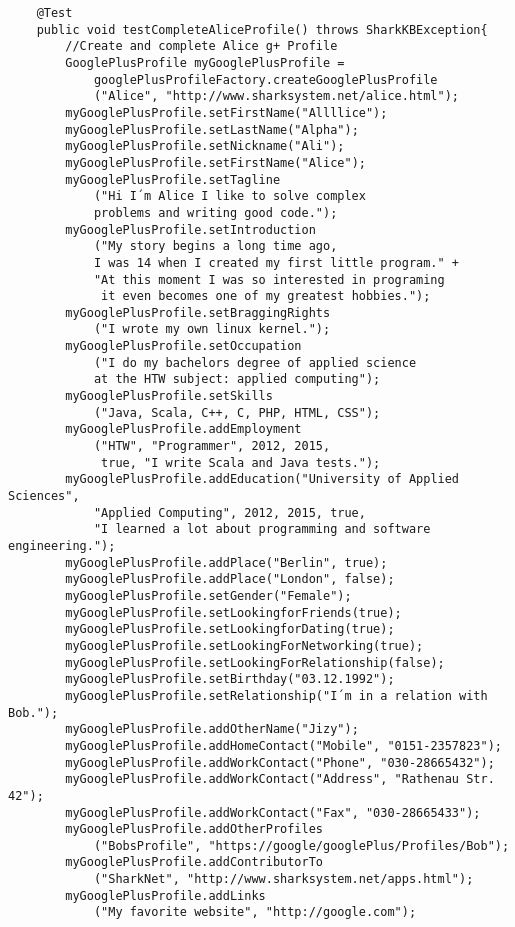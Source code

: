 \documentclass[12pt]{article}
\begin{document}
\begin{verbatim}
    @Test
    public void testCompleteAliceProfile() throws SharkKBException{
        //Create and complete Alice g+ Profile
        GooglePlusProfile myGooglePlusProfile =
            googlePlusProfileFactory.createGooglePlusProfile
            ("Alice", "http://www.sharksystem.net/alice.html");
        myGooglePlusProfile.setFirstName("Allllice");
        myGooglePlusProfile.setLastName("Alpha");
        myGooglePlusProfile.setNickname("Ali");
        myGooglePlusProfile.setFirstName("Alice");
        myGooglePlusProfile.setTagline
            ("Hi I´m Alice I like to solve complex
            problems and writing good code.");
        myGooglePlusProfile.setIntroduction
            ("My story begins a long time ago,
            I was 14 when I created my first little program." +
            "At this moment I was so interested in programing
             it even becomes one of my greatest hobbies.");
        myGooglePlusProfile.setBraggingRights
            ("I wrote my own linux kernel.");
        myGooglePlusProfile.setOccupation
            ("I do my bachelors degree of applied science
            at the HTW subject: applied computing");
        myGooglePlusProfile.setSkills
            ("Java, Scala, C++, C, PHP, HTML, CSS");
        myGooglePlusProfile.addEmployment
            ("HTW", "Programmer", 2012, 2015,
             true, "I write Scala and Java tests.");
        myGooglePlusProfile.addEducation("University of Applied Sciences",
            "Applied Computing", 2012, 2015, true,
            "I learned a lot about programming and software engineering.");
        myGooglePlusProfile.addPlace("Berlin", true);
        myGooglePlusProfile.addPlace("London", false);
        myGooglePlusProfile.setGender("Female");
        myGooglePlusProfile.setLookingforFriends(true);
        myGooglePlusProfile.setLookingforDating(true);
        myGooglePlusProfile.setLookingForNetworking(true);
        myGooglePlusProfile.setLookingForRelationship(false);
        myGooglePlusProfile.setBirthday("03.12.1992");
        myGooglePlusProfile.setRelationship("I´m in a relation with Bob.");
        myGooglePlusProfile.addOtherName("Jizy");
        myGooglePlusProfile.addHomeContact("Mobile", "0151-2357823");
        myGooglePlusProfile.addWorkContact("Phone", "030-28665432");
        myGooglePlusProfile.addWorkContact("Address", "Rathenau Str. 42");
        myGooglePlusProfile.addWorkContact("Fax", "030-28665433");
        myGooglePlusProfile.addOtherProfiles
            ("BobsProfile", "https://google/googlePlus/Profiles/Bob");
        myGooglePlusProfile.addContributorTo
            ("SharkNet", "http://www.sharksystem.net/apps.html");
        myGooglePlusProfile.addLinks
            ("My favorite website", "http://google.com");
       

\end{verbatim}
\end{document}
